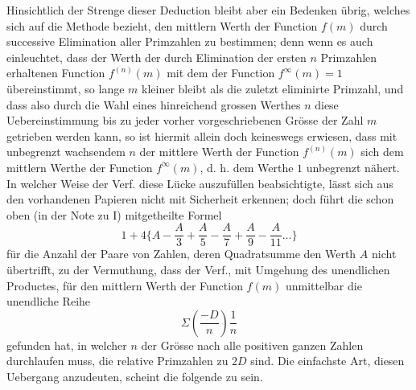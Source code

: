 Hinsichtlich der Strenge dieser Deduction bleibt aber ein Bedenken übrig, welches sich auf die Methode bezieht, den mittlern Werth der Function $f(m)$ durch successive Elimination aller Primzahlen zu bestimmen; denn wenn es auch einleuchtet, dass der Werth der durch Elimination der ersten $n$ Primzahlen erhaltenen Function $f^{(n)}(m)$ mit dem der Function $f^\infty(m)=1$ übereinstimmt, so lange $m$ kleiner bleibt als die zuletzt eliminirte Primzahl, und dass also durch die Wahl eines hinreichend grossen Werthes $n$ diese Uebereinstimmung bis zu jeder vorher vorgeschriebenen Grösse der Zahl $m$ getrieben werden kann, so ist hiermit allein doch keineswegs erwiesen, dass mit unbegrenzt wachsendem $n$ der mittlere Werth der Function $f^{(n)}(m)$ sich dem mittlern Werthe der Function $f^\infty(m)$, d. h. dem Werthe $1$ unbegrenzt nähert. In welcher Weise der Verf. diese Lücke auszufüllen beabsichtigte, lässt sich aus den vorhandenen Papieren nicht mit Sicherheit erkennen; doch führt die schon oben (in der Note zu I) mitgetheilte Formel
\[
1+4\{A-\frac A3+\frac A5-\frac A7+\frac A9-\frac A{11}\ldots\}
\]
für die Anzahl der Paare von Zahlen, deren Quadratsumme den Werth $A$ nicht übertrifft, zu der Vermuthung, dass der Verf., mit Umgehung des unendlichen Productes, für den mittlern Werth der Function $f(m)$ unmittelbar die unendliche Reihe
\[
\Sigma\left(\frac{-D}n\right)\frac1n
\]
gefunden hat, in welcher $n$ der Grösse nach alle positiven ganzen Zahlen durchlaufen muss, die relative Primzahlen zu $2D$ sind. Die einfachste Art, diesen Uebergang anzudeuten, scheint die folgende zu sein.

